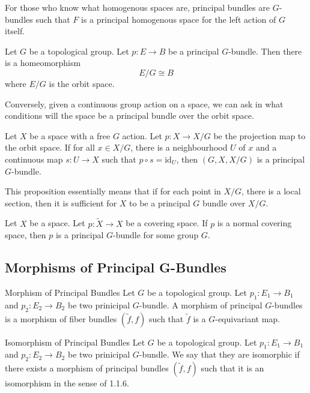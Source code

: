 \documentclass[a4paper]{article}
\begin{document}
For those who know what homogenous spaces are, principal bundles are $G$-bundles such that $F$ is a principal homogenous space for the left action of $G$ itself. 

\begin{prp}{}{} Let $G$ be a topological group. Let $p:E\to B$ be a principal $G$-bundle. Then there is a homeomorphism $$E/G\cong B$$ where $E/G$ is the orbit space. 
\end{prp}

Conversely, given a continuous group action on a space, we can ask in what conditions will the space be a principal bundle over the orbit space. 

\begin{prp}{}{} Let $X$ be a space with a free $G$ action. Let $p:X\to X/G$ be the projection map to the orbit space. If for all $x\in X/G$, there is a neighbourhood $U$ of $x$ and a continuous map $s:U\to X$ such that $p\circ s=\text{id}_U$, then $(G,X,X/G)$ is a principal $G$-bundle. 
\end{prp}

This proposition essentially means that if for each point in $X/G$, there is a local section, then it is sufficient for $X$ to be a principal $G$ bundle over $X/G$. 

\begin{prp}{}{} Let $X$ be a space. Let $p:\tilde{X}\to X$ be a covering space. If $p$ is a normal covering space, then $p$ is a principal $G$-bundle for some group $G$. 
\end{prp}

\subsection{Morphisms of Principal G-Bundles}
\begin{defn}{Morphism of Principal Bundles}{} Let $G$ be a topological group. Let $p_1:E_1\to B_1$ and $p_2:E_2\to B_2$ be two prinicipal $G$-bundle. A morphism of principal $G$-bundles is a morphism of fiber bundles $(\tilde{f},f)$ such that $\tilde{f}$ is a $G$-equivariant map. 
\end{defn}

\begin{defn}{Isomorphism of Principal Bundles}{} Let $G$ be a topological group. Let $p_1:E_1\to B_1$ and $p_2:E_2\to B_2$ be two prinicipal $G$-bundle. We say that they are isomorphic if there exists a morphism of principal bundles $(\tilde{f},f)$ such that it is an isomorphism in the sense of 1.1.6. 
\end{defn}
\end{document}

